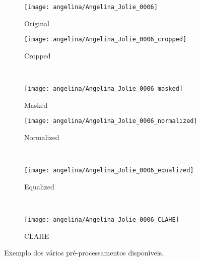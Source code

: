 \begin{figure}
        \centering
        \begin{subfigure}[b]{0.2\textwidth}
                \centering
                \texttt{[image: angelina/Angelina\_Jolie\_0006]}
                \caption{Original}
                \label{fig:original-original} 
        \end{subfigure}%
%

        \begin{subfigure}[b]{0.2\textwidth}
                \centering
                \texttt{[image: angelina/Angelina\_Jolie\_0006\_cropped]}
                \caption{Cropped}
                \label{fig:cropped} 
        \end{subfigure}
        ~ ~
        \begin{subfigure}[b]{0.2\textwidth}
                \centering
                \texttt{[image: angelina/Angelina\_Jolie\_0006\_masked]}
                \caption{Masked}
                \label{fig:masked}
        \end{subfigure}%
%

        \begin{subfigure}[b]{0.2\textwidth}
                \centering
                \texttt{[image: angelina/Angelina\_Jolie\_0006\_normalized]}
                \caption{Normalized}
                \label{fig:normalized} 
        \end{subfigure}
        ~ ~
        \begin{subfigure}[b]{0.2\textwidth}
                \centering
                \texttt{[image: angelina/Angelina\_Jolie\_0006\_equalized]}
                \caption{Equalized}
                \label{fig:equalized}
        \end{subfigure}
        ~ ~
        \begin{subfigure}[b]{0.2\textwidth}
                \centering
                \texttt{[image: angelina/Angelina\_Jolie\_0006\_CLAHE]}
                \caption{CLAHE}
                \label{fig:clahe}
        \end{subfigure}
        \caption{Exemplo dos vários pré-processamentos disponíveis.}
        \label{fig:galeriaspreprocessadas}   
\end{figure}


